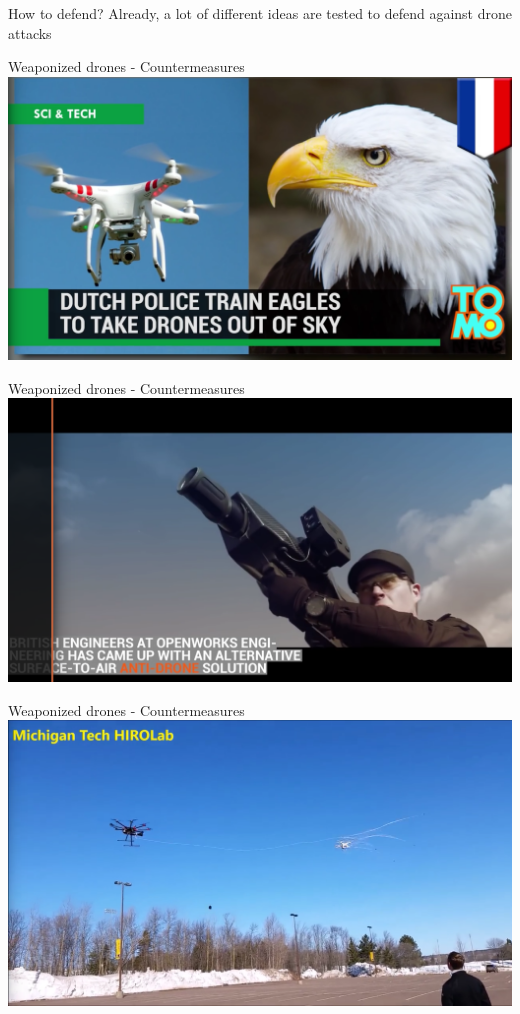 \documentclass[aspectratio=169]{beamer}
\begin{document}
\begin{frame}{How to defend?}
	Already, a lot of different ideas are tested to defend against drone attacks
\end{frame}

\begin{frame}{Weaponized drones - Countermeasures}
\centering
            \href{run:./videos/EaglesVsDrones.mp4?autostart}
            {\includegraphics[width=.98\linewidth]{images/EaglesVsDrones.png}}
\end{frame}

\begin{frame}{Weaponized drones - Countermeasures}
\centering
            \href{run:./videos/SkyWall.mp4?autostart}
            {\includegraphics[width=.98\linewidth]{images/SkyWall.png}}
\end{frame}

\begin{frame}{Weaponized drones - Countermeasures}
\centering
            \href{run:./videos/DroneCatcher.mp4?autostart}
            {\includegraphics[width=.98\linewidth]{images/DroneCatcher.png}}
\end{frame}
\end{document}
